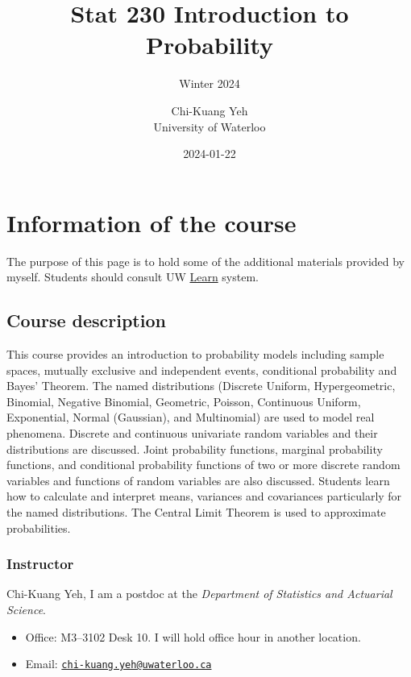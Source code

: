 \documentclass[
]{book}
\title{Stat 230 Introduction to Probability}
\subtitle{Winter 2024}
\author{Chi-Kuang Yeh\\
University of Waterloo}
\date{2024-01-22}
\providecommand{\tightlist}{%
  \setlength{\itemsep}{0pt}\setlength{\parskip}{0pt}}
\theoremstyle{definition}
\theoremstyle{definition}
\theoremstyle{definition}
\theoremstyle{definition}
\theoremstyle{remark}
\begin{document}
\maketitle

{
\setcounter{tocdepth}{1}
\tableofcontents
}
\hypertarget{information-of-the-course}{%
\chapter{Information of the course}\label{information-of-the-course}}

The purpose of this page is to hold some of the additional materials provided by myself. Students should consult UW \href{https://api-4ccc589b.duosecurity.com/frame/v4/preauth/healthcheck?sid=frameless-c0657e9d-cb86-4ac9-a6a7-fd054ae21fd5}{Learn} system.

\hypertarget{course-description}{%
\section{Course description}\label{course-description}}

This course provides an introduction to probability models including sample spaces, mutually exclusive and independent events, conditional probability and Bayes' Theorem. The named distributions (Discrete Uniform, Hypergeometric, Binomial, Negative Binomial, Geometric, Poisson, Continuous Uniform, Exponential, Normal (Gaussian), and Multinomial) are used to model real phenomena. Discrete and continuous univariate random variables and their distributions are discussed. Joint probability functions, marginal probability functions, and conditional probability functions of two or more discrete random variables and functions of random variables are also discussed. Students learn how to calculate and interpret means, variances and covariances particularly for the named distributions. The Central Limit Theorem is used to approximate probabilities.

\hypertarget{instructor}{%
\subsection{Instructor}\label{instructor}}

Chi-Kuang Yeh, I am a postdoc at the \emph{Department of Statistics and Actuarial Science}.

\begin{itemize}
\tightlist
\item
  Office: M3--3102 Desk 10. I will hold office hour in another location.
\item
  Email: \href{mailto:chi-kuang.yeh@uwaterloo.ca}{\nolinkurl{chi-kuang.yeh@uwaterloo.ca}}
\end{itemize}
\end{document}
